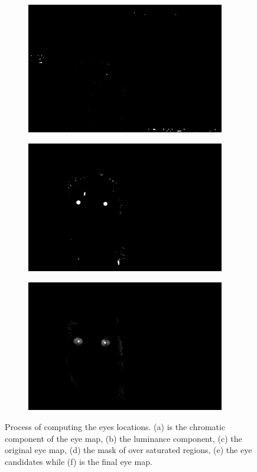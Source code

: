 \begin{figure}[H]
\begin{subfigure}{.33\textwidth}
  \centering
  \includegraphics[width=0.95\textwidth]{img/fd/OverSaturatedMask.png}
  \caption{}
\end{subfigure}%
\begin{subfigure}{.33\textwidth}
  \centering
  \includegraphics[width=0.95\textwidth]{img/fd/FilteredFaceMaskEyesReal.png}
  \caption{}
\end{subfigure}%
\begin{subfigure}{.33\textwidth}
  \centering
  \includegraphics[width=0.95\textwidth]{img/fd/EyeMap2.png}
  \caption{}
\end{subfigure}%

\caption{Process of computing the eyes locations. (a) is the chromatic component of the eye map, (b) the luminance component, (c) the original eye map, (d) the mask of over saturated regions, (e) the eye candidates while (f) is the final eye map.}
\label{fig:eyeMap}
\end{figure}